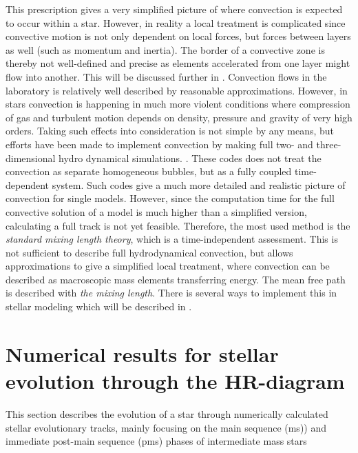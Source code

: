 This prescription gives a very simplified picture of where convection is expected to occur within a star. However, in reality a local treatment is complicated since convective motion is not only dependent on local forces, but forces between layers as well (such as momentum and inertia). The border of a convective zone is thereby not well-defined and precise as elements accelerated from one layer might flow into another. This will be discussed further in . 
Convection flows in the laboratory is relatively well described by reasonable approximations. However, in stars convection is happening in much more violent conditions where compression of gas and turbulent motion depends on density, pressure and gravity of very high orders.  Taking such effects into consideration is not simple by any means, but efforts have been made to implement convection by making full two- and three-dimensional hydro dynamical simulations. \citep{nordlund19903}. These codes does not treat the convection as separate homogeneous bubbles, but as a fully coupled time-dependent system. Such codes give a much more detailed and realistic picture of convection for single models. However, since the computation time for the full convective solution of a model is much higher than a simplified version, calculating a full track is not yet feasible. Therefore, the most used method is the \textit{standard mixing length theory}, which is a time-independent assessment. This is not sufficient to describe full hydrodynamical convection, but allows approximations to give a simplified local treatment, where convection can be described as macroscopic mass elements transferring energy. The mean free path is described with \textit{the mixing length}. There is several ways to implement this in stellar modeling which will be described in . 


\section[Stellar evolution through the HR-diagram]{Numerical results for stellar evolution through the HR-diagram}
This section describes the evolution of a star through numerically calculated stellar evolutionary tracks, mainly focusing on the main sequence (ms)) and immediate post-main sequence (pms) phases of intermediate mass stars

